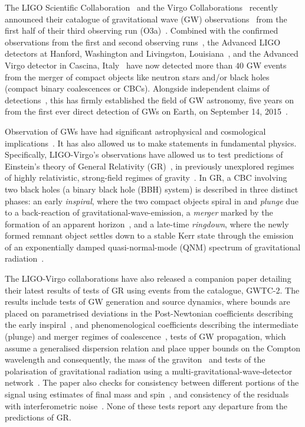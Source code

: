 \documentclass[twocolumn,prd,superscriptaddress,amsfonts,amssymb,amsmath,preprintnumbers]{revtex4-1}
\begin{document}
The LIGO Scientific Collaboration~\citep{lsc} and the Virgo Collaborations~\citep{Virgo} recently announced their catalogue of gravitational wave (GW) observations~\citep{GWTC-2} from the first half of their third observing run (O3a)~\citep{O3reference}. Combined with the confirmed observations from the first and second observing runs~\citep{abbott2019gwtc}, the Advanced LIGO detectors at Hanford, Washington and Livingston, Louisiana~\citep{aasi2015characterization}, and the Advanced Virgo detector in Cascina, Italy~\citep{acernese2014advanced} have now detected more than $40$ GW events from the merger of compact objects like neutron stars and/or black holes (compact binary coalescences or CBCs). Alongside independent claims of detections~\citep{nitz20191,nitz20202,2019PhRvD.100b3007Z,2020PhRvD.101h3030V,Venumadhav_2020}, this has firmly established the field of GW astronomy, five years on from the first ever direct detection of GWs on Earth, on September 14, 2015~\citep{abbott2016observation}.
\par
Observation of GWs have had significant astrophysical and cosmological implications~\citep{LSC_2016astroph,gw170817_mma,gw170817_joint,gw170817_hubble}. It has also allowed us to make statements in fundamental physics. Specifically, LIGO-Virgo's observations have allowed us to test predictions of Einstein's theory of General Relativity (GR)~\citep[GR]{}, in previously unexplored regimes of highly relativistic, strong-field regimes of gravity~\citep{LSC_2016grtests,GW170817_TGR,gwtc1_tgr}. In GR, a CBC involving two black holes (a binary black hole (BBH) system) is described in three distinct phases: an early \textit{inspiral}, where the two compact objects spiral in and \textit{plunge} due to a back-reaction of gravitational-wave-emission, a \textit{merger} marked by the formation of an apparent horizon~\citep{NRpaper}, and a late-time \textit{ringdown}, where the newly formed remnant object settles down to a stable Kerr state through the emission of an exponentially damped quasi-normal-mode (QNM) spectrum of gravitational radiation~\citep{vishu,earlyqnmpapers}.  
\par
The LIGO-Virgo collaborations have also released a companion paper detailing their latest results of tests of GR using events from the catalogue, GWTC-2. The results include tests of GW generation and source dynamics, where bounds are placed on parametrised deviations in the Post-Newtonian coefficients describing the early inspiral~\citep{earlydevelopmentpapers}, and phenomenological coefficients describing the intermediate (plunge) and merger regimes of coalescence~\citep{TIGERmethodspapers}, tests of GW propagation, which assume a generalised dispersion relation and place upper bounds on the Compton wavelength and consequently, the mass of the graviton~\citep{gw170104,samajdar2017projected} and tests of the polarisation of gravitational radiation using a multi-gravitational-wave-detector network~\citep{gw170814,isi2017probing}. The paper also checks for consistency between different portions of the signal using estimates of final mass and spin~\citep{Ghosh:2016xx,Ghosh:2017gfp,LSC_2016grtests}, and consistency of the residuals with interferometric noise~\citep{Ghonge:2020suv,gwtc1_tgr}. None of these tests report any departure from the predictions of GR.
\end{document}

